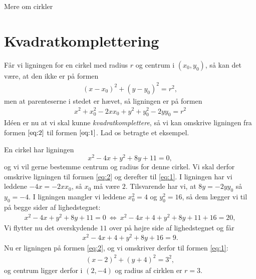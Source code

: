 
\begin{center}
\Huge
Mere om cirkler
\end{center}
\section*{Kvadratkomplettering}

Får vi ligningen for en cirkel med radius $r$ og centrum i $(x_0,y_0)$, så kan det være, at den ikke er på formen 
\begin{align}\label{eq:1}
(x-x_0)^2 + (y-y_0)^2 = r^2,
\end{align}
men at parenteserne i stedet er hævet, så ligningen er på formen
\begin{align}\label{eq:2}
x^2+x_0^2-2xx_0 + y^2+y_0^2-2yy_0 = r^2
\end{align}
Idéen er nu at vi skal kunne \textit{kvadratkomplettere}, så vi kan omskrive ligningen fra formen $\eqref{eq:2}$ til formen $\eqref{eq:1}$. Lad os betragte et eksempel.
\begin{exa}
En cirkel har ligningen 
\[
	x^2-4x+y^2+8y+11=0,
\]
og vi vil gerne bestemme centrum og radius for denne cirkel. Vi skal derfor omskrive ligningen til formen \eqref{eq:2} og derefter til \eqref{eq:1}. I ligningen har vi leddene $-4x = -2xx_0$, så $x_0$ må være $2$. Tilsvarende har vi, at $8y = -2yy_0$ så $y_0 = -4$. I ligningen mangler vi leddene $x_0^2 = 4$ og $y_0^2 = 16$, så dem lægger vi til på begge sider af lighedstegnet:
\begin{align*}
x^2-4x+y^2+8y+11=0 \ \Leftrightarrow \ x^2-4x + 4 +y^2+8y+11 + 16=20,
\end{align*}
Vi flytter nu det overskydende $11$ over på højre side af lighedstegnet og får
\begin{align*}
x^2-4x+4+y^2+8y+16 = 9.
\end{align*}
Nu er ligningen på formen \eqref{eq:2}, og vi omskriver derfor til formen \eqref{eq:1}:
\begin{align*}
(x-2)^2+(y+4)^2= 3^2,
\end{align*}
og centrum ligger derfor i $(2,-4)$ og radius af cirklen er $r=3$. 
\end{exa}

